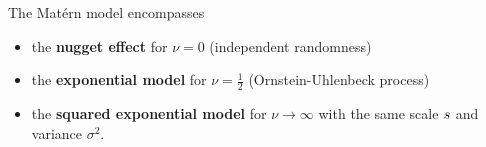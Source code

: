 
\begin{remark}
	The Matérn model encompasses
	\begin{itemize}
		\item the \textbf{nugget effect} for \(\nu=0\) (independent randomness)
		\item the \textbf{exponential model} for \(\nu=\tfrac12\) (Ornstein-Uhlenbeck process)
		\item the \textbf{squared exponential model} for \(\nu\to \infty\) with the same
		scale \(s\) and variance \(\sigma^2\).
	\end{itemize}
\end{remark}
